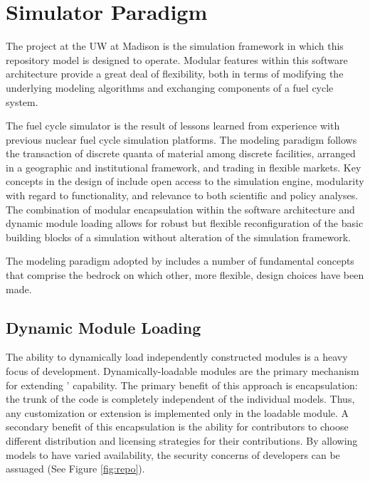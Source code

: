 \section{\Cyclus Simulator Paradigm }

The \Cyclus project at the \gls{UW} at Madison is the 
simulation framework in which this repository model is designed to 
operate.  Modular features within this software architecture provide a 
great deal of flexibility, both in terms of modifying the underlying 
modeling algorithms and exchanging components of a fuel cycle system.

The \Cyclus fuel cycle simulator is the  result of lessons learned 
from experience with previous nuclear fuel cycle simulation platforms.  
The modeling paradigm follows the transaction of discrete quanta of 
material among discrete facilities, arranged in a geographic and 
institutional framework, and trading in
flexible markets. Key concepts in the design of \Cyclus include open
access to the simulation engine, modularity with regard to
functionality, and relevance to both scientific and policy
analyses. The combination of modular encapsulation within the
software architecture and dynamic module loading allows for robust but 
flexible reconfiguration of the basic building blocks of a simulation 
without alteration of the simulation framework.  

The modeling paradigm adopted by \Cyclus includes a number of
fundamental concepts that comprise the bedrock on which other, more
flexible, design choices have been made. 

\subsection{Dynamic Module Loading}

The ability to dynamically load independently constructed modules is a
heavy focus of \Cyclus development. Dynamically-loadable modules are
the primary mechanism for extending \Cyclus' capability. The primary
benefit of this approach is encapsulation: the trunk of the code is
completely independent of the individual models. Thus, any
customization or extension is implemented only in the loadable
module. A secondary benefit of this encapsulation is the ability for
contributors to choose different distribution and licensing strategies
for their contributions. By allowing models to have varied
availability, the security concerns of developers can be
assuaged (See Figure \ref{fig:repo}). 

